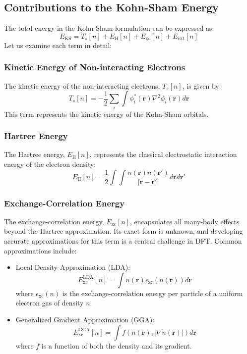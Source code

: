 \subsection{Contributions to the Kohn-Sham Energy}
The total energy in the Kohn-Sham formulation can be expressed as:
\begin{equation}
E_{\text{KS}} = T_s[n] + E_{\text{H}}[n] + E_{\text{xc}}[n] + E_{\text{ext}}[n]
\end{equation}
Let us examine each term in detail:
\subsubsection{Kinetic Energy of Non-interacting Electrons}
The kinetic energy of the non-interacting electrons, $T_s[n]$, is given by:
\begin{equation}
T_s[n] = -\frac{1}{2}\sum_i \int \phi_i^*(\mathbf{r})\nabla^2\phi_i(\mathbf{r})d\mathbf{r}
\end{equation}
This term represents the kinetic energy of the Kohn-Sham orbitals.
\subsubsection{Hartree Energy}
The Hartree energy, $E_{\text{H}}[n]$, represents the classical electrostatic interaction energy of the electron density:
\begin{equation}
E_{\text{H}}[n] = \frac{1}{2}\int\int \frac{n(\mathbf{r})n(\mathbf{r'})}{|\mathbf{r}-\mathbf{r'}|}d\mathbf{r}d\mathbf{r'}
\end{equation}
\subsubsection{Exchange-Correlation Energy}
The exchange-correlation energy, $E_{\text{xc}}[n]$, encapsulates all many-body effects beyond the Hartree approximation. Its exact form is unknown, and developing accurate approximations for this term is a central challenge in DFT. Common approximations include:
\begin{itemize}
\item Local Density Approximation (LDA):
\begin{equation}
E_{\text{xc}}^{\text{LDA}}[n] = \int n(\mathbf{r})\epsilon_{\text{xc}}(n(\mathbf{r}))d\mathbf{r}
\end{equation}
where $\epsilon_{\text{xc}}(n)$ is the exchange-correlation energy per particle of a uniform electron gas of density $n$.
\item Generalized Gradient Approximation (GGA):
\begin{equation}
E_{\text{xc}}^{\text{GGA}}[n] = \int f(n(\mathbf{r}), |\nabla n(\mathbf{r})|)d\mathbf{r}
\end{equation}
where $f$ is a function of both the density and its gradient.
\end{itemize}
